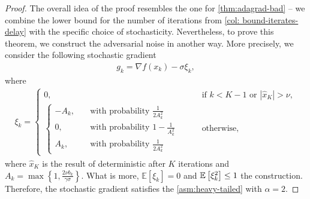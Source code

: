 \documentclass{article}
\begin{document}
\begin{proof}
    The overall idea of the proof resembles the one for \cref{thm:adagrad-bad} -- we combine the lower bound for the number of iterations from \cref{col: bound-iterates-delay} with the specific choice of stochasticity. Nevertheless, to prove this theorem, we construct the adversarial noise in another way. More precisely, we consider the following stochastic gradient
    \begin{align*}
        g_k = \nabla f(x_k) - \sigma \xi_k,
    \end{align*}
    where
    \begin{align}
        \label{eq:noise-delay}
        \xi_k = \begin{cases}
            0, \qquad &\text{if } k < K - 1 \text{ or } |\hat{x}_K| > \nu,\\
            \begin{cases}
                -A_k, &\quad \text{with probability } \frac{1}{2A_k^2}\\
                0, &\quad \text{with probability } 1 - \frac{1}{A_k^2}\\
                A_k, &\quad \text{with probability } \frac{1}{2A_k^2}
            \end{cases}
            \qquad &\text{otherwise,}
        \end{cases}
    \end{align}
    where $\hat{x}_K$ is the result of deterministic  after $K$ iterations and $A_k = \max\left\{1, \frac{2\nu b_{k}}{\gamma \sigma}\right\}$. 
    What is more, $\mathbb{E}\left[\xi_k\right] = 0$ and $\mathbb{E}\left[\xi_k^2\right] \leq 1$  the construction. Therefore, the stochastic gradient satisfies the \cref{asm:heavy-tailed} with $\alpha = 2$.
    

\end{proof}
\end{document}
